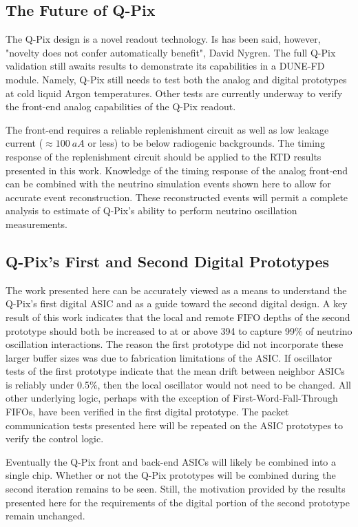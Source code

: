 \subsection{The Future of Q-Pix}

The Q-Pix design is a novel readout technology.
Is has been said, however, "novelty does not confer automatically benefit", David Nygren.
The full Q-Pix validation still awaits results to demonstrate its capabilities in a DUNE-FD module.
Namely, Q-Pix still needs to test both the analog and digital prototypes at cold liquid Argon temperatures.
Other tests are currently underway to verify the front-end analog capabilities of the Q-Pix readout.

The front-end requires a reliable replenishment circuit as well as low leakage current ($\approx 100~\unit{aA}$ or less) to be below radiogenic backgrounds.
The timing response of the replenishment circuit should be applied to the RTD results presented in this work.
Knowledge of the timing response of the analog front-end can be combined with the neutrino simulation events shown here to allow for accurate event reconstruction.
These reconstructed events will permit a complete analysis to estimate of Q-Pix's ability to perform neutrino oscillation measurements.

\subsection{Q-Pix's First and Second Digital Prototypes}

The work presented here can be accurately viewed as a means to understand the Q-Pix's first digital ASIC and as a guide toward the second digital design.
A key result of this work indicates that the local and remote FIFO depths of the second prototype should both be increased to at or above 394 to capture 99\% of neutrino oscillation interactions.
The reason the first prototype did not incorporate these larger buffer sizes was due to fabrication limitations of the ASIC.
If oscillator tests of the first prototype indicate that the mean drift between neighbor ASICs is reliably under 0.5\%, then the local oscillator would not need to be changed.
All other underlying logic, perhaps with the exception of First-Word-Fall-Through FIFOs, have been verified in the first digital prototype.
The packet communication tests presented here will be repeated on the ASIC prototypes to verify the control logic.

Eventually the Q-Pix front and back-end ASICs will likely be combined into a single chip.
Whether or not the Q-Pix prototypes will be combined during the second iteration remains to be seen.
Still, the motivation provided by the results presented here for the requirements of the digital portion of the second prototype remain unchanged.
